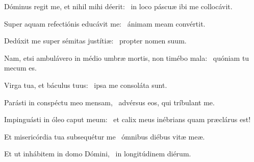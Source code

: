\item Dóminus regit me, et nihil mihi déerit:~\psstar{} in loco páscuæ ibi me collocávit.

\item Super aquam refectiónis educávit me:~\psstar{} ánimam meam convértit.

\item Dedúxit me super sémitas justítiæ:~\psstar{} propter nomen suum.

\item Nam, etsi ambulávero in médio umbræ mortis, non timébo mala:~\psstar{} quóniam tu mecum es.

\item Virga tua, et báculus tuus:~\psstar{} ipsa me consoláta sunt.

\item Parásti in conspéctu meo mensam,~\psstar{} advérsus eos, qui tríbulant me.

\item Impinguásti in óleo caput meum:~\psstar{} et calix meus inébrians quam præclárus est!

\item Et misericórdia tua subsequé\-tur me~\psstar{} ómnibus diébus vitæ meæ.

\item Et ut inhábitem in domo Dómini,~\psstar{} in longitúdinem diérum.

